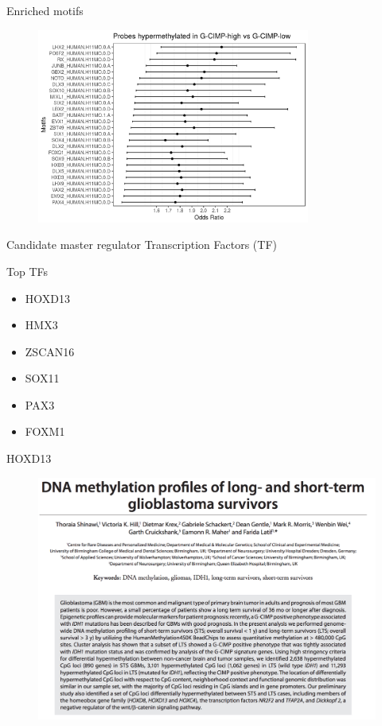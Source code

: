 \documentclass[slidestop,compress,11pt,xcolor=dvipsnames]{beamer}
\begin{document}
\begin{frame}{Enriched motifs}
 \begin{figure}[ht!]
  \centering
  \includegraphics[width=0.8\textwidth]{glioma/or.png}
 \end{figure}
\end{frame}

\begin{frame}{Candidate master regulator Transcription Factors (TF) }
\begin{block}{Top TFs}
  \begin{itemize}
    \item  HOXD13
    \item  HMX3
    \item  ZSCAN16
    \item  SOX11
    \item  PAX3
    \item  FOXM1
  \end{itemize}
\end{block}
\end{frame}

\begin{frame}{HOXD13}
\vspace{-0.5cm}
 \begin{figure}[ht!]
  \centering
  \includegraphics[width=1.0\textwidth]{glioma/paper_HOXD13b.png}
 \end{figure}
\end{frame}
\end{document}
